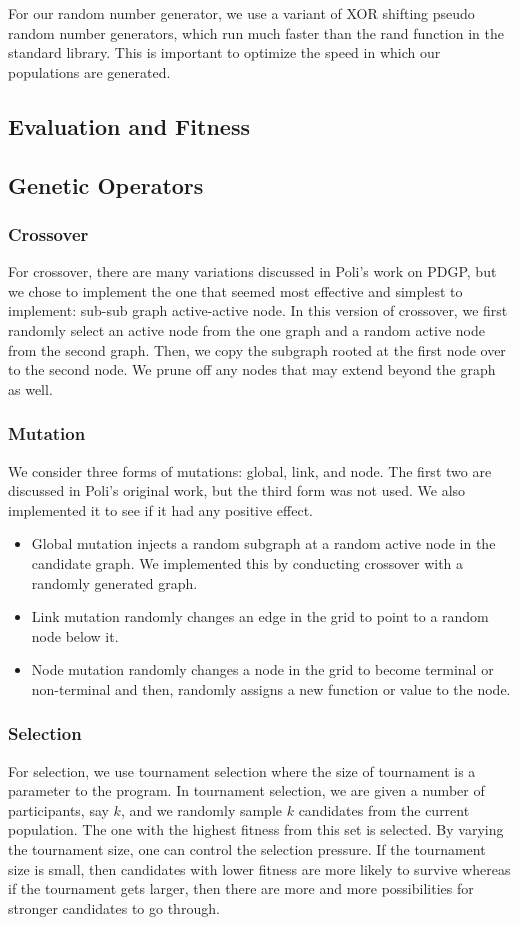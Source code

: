 \documentclass[12pt,conference]{IEEEtran}
\begin{document}
	For our random number generator, we use a variant of XOR shifting pseudo random number generators, which run much faster than the rand function in the standard library. This is important to optimize the speed in which our populations are generated.
	\subsection{Evaluation and Fitness}
	
	\subsection{Genetic Operators}
	\subsubsection{Crossover}
	For crossover, there are many variations discussed in Poli’s work on PDGP, but we chose to implement the one that seemed most effective and simplest to implement: sub-sub graph active-active node. In this version of crossover, we first randomly select an active node from the one graph and a random active node from the second graph. Then, we copy the subgraph rooted at the first node over to the second node. We prune off any nodes that may extend beyond the graph as well.
	\subsubsection{Mutation}
	We consider three forms of mutations: global, link, and node. The first two are discussed in Poli’s original work, but the third form was not used. We also implemented it to see if it had any positive effect.
	\begin{itemize}
		\item Global mutation injects a random subgraph at a random active node in the candidate graph. We implemented this by conducting crossover with a randomly generated graph.
		
		\item Link mutation randomly changes an edge in the grid to point to a random node below it.
		
		\item Node mutation randomly changes a node in the grid to become terminal or non-terminal and then, randomly assigns a new function or value to the node.
		
	\end{itemize}
	\subsubsection{Selection}
	For selection, we use tournament selection where the size of tournament is a parameter to the program. In tournament selection, we are given a number of participants, say $k$, and we randomly sample $k$ candidates from the current population. The one with the highest fitness from this set is selected. By varying the tournament size, one can control the selection pressure. If the tournament size is small, then candidates with lower fitness are more likely to survive whereas if the tournament gets larger, then there are more and more possibilities for stronger candidates to go through.
	
\end{document}
